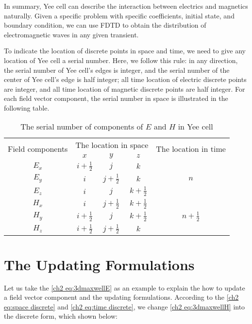 In summary, Yee cell can describe the interaction between electrics and magnetics naturally. Given a specific problem with specific coefficients, initial state, and boundary condition, we can use FDTD to obtain the distribution of electromagnetic waves in any given transient.

To indicate the location of discrete points in space and time, we need to give any location of Yee cell a serial number. Here, we follow this rule: in any direction, the serial number of Yee cell's edges is integer, and the serial number of the center of Yee cell's edge is half integer; all time location of electric discrete points are integer, and all time location of magnetic discrete points are half integer. For each field vector component, the serial number in space is illustrated in the following table.

\begin{table}
\caption{The serial number of components of $\mathbf{\mathit{E}}$ and $\mathbf{\mathit{H}}$ in Yee cell}
	\centering
	\begin{tabular}{ccccc}
		\toprule
		\multirow{2}{5em}{Field components} & \multicolumn{3}{c}{The location in space} & \multirow{2}{6em}{The location in time}\\
		\cline{2-4}
		& $x$ & $y$ & $z$ &\\
		
		\midrule
		$E_x$ & $i+\frac{1}{2}$ & $j$ & $k$ & \multirow{3}{1em}{$n$}\\
		\cline{1-4}
		$E_y$ & $i$ & $j+\frac{1}{2}$ & $k$ & \\
		\cline{1-4}
		$E_z$ & $i$ & $j$ & $k+\frac{1}{2}$ & \\
		\cline{1-5}
		
		$H_x$ & $i$ & $j+\frac{1}{2}$ & $k+\frac{1}{2}$ & \multirow{3}{3em}{$n+\frac{1}{2}$}\\
		\cline{1-4}
		$H_y$ & $i+\frac{1}{2}$ & $j$ & $k+\frac{1}{2}$ & \\
		\cline{1-4}
		$H_z$ & $i+\frac{1}{2}$ & $j+\frac{1}{2}$ & $k$ & \\		
		\bottomrule
	\end{tabular}
\end{table}

\section{The Updating Formulations}

Let us take the \eqref{ch2 eq:3dmaxwellE} as an example to explain the how to update a field vector component and the updating formulations. According to the \eqref{ch2 eq:space discrete} and \eqref{ch2 eq:time discrete}, we change \eqref{ch2 eq:3dmaxwellH} into the discrete form, which shown below:

